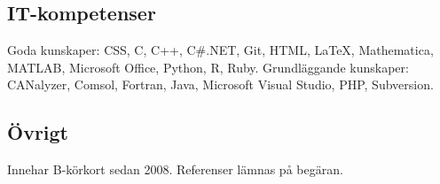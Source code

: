 \documentclass{skvitae}
\begin{document}
	\medskip
	\subsection{IT-kompetenser}
	\ind Goda kunskaper: CSS, C, C++, C\#.NET, Git, HTML, \LaTeX, Mathematica, MATLAB, Microsoft Office, Python, R, Ruby.
	\ind Grundläggande kunskaper: CANalyzer, Comsol, Fortran, Java, Microsoft Visual Studio, PHP, Subversion.

	\medskip
	\subsection{Övrigt}
	\ind Innehar B-körkort sedan 2008.
	\ind Referenser lämnas på begäran.
\end{document}
